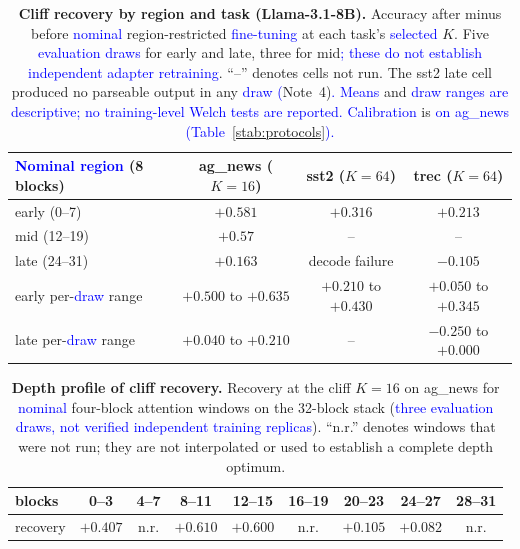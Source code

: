 \documentclass[11pt]{article}
\begin{document}
\begin{table}[h]
\centering
\caption{\textbf{Cliff recovery by region and task (Llama-3.1-8B).} Accuracy after minus
before \textcolor{blue}{nominal} region-restricted \textcolor{blue}{fine-tuning} at each task's \textcolor{blue}{selected} $K$. Five \textcolor{blue}{evaluation
draws} for early and late, three for mid\textcolor{blue}{; these do not establish independent adapter
retraining}. ``--'' denotes cells not run. The sst2 late cell produced no parseable output
in any \textcolor{blue}{draw (}Note~4)\textcolor{blue}{. Means} and \textcolor{blue}{draw ranges are descriptive; no training-level Welch
tests are reported. Calibration} is \textcolor{blue}{on ag\_}\textcolor{blue}{news (Table}~\textcolor{blue}{\ref{stab:protocols}}\textcolor{blue}{).}}
\label{stab:region}
\footnotesize
\begin{tabular}{lccc}
\toprule
\textcolor{blue}{Nominal region} (8 blocks) & ag\_news ($K{=}16$) & sst2 ($K{=}64$) & trec ($K{=}64$) \\
\midrule
early (0--7)  & $+0.581$ & $+0.316$ & $+0.213$ \\
mid (12--19)  & $+0.57$  & --       & --       \\
late (24--31) & $+0.163$ & decode failure & $-0.105$ \\
\midrule
early per-\textcolor{blue}{draw} range & $+0.500$ to $+0.635$ & $+0.210$ to $+0.430$ & $+0.050$ to $+0.345$ \\
late per-\textcolor{blue}{draw} range  & $+0.040$ to $+0.210$ & --                   & $-0.250$ to $+0.000$ \\
\bottomrule
\end{tabular}
\end{table}



\begin{table}[h]
\centering
\caption{\textbf{Depth profile of cliff recovery.} Recovery at the cliff $K{=}16$ on
ag\_news for \textcolor{blue}{nominal} four-block attention windows on the 32-block stack (\textcolor{blue}{three evaluation
draws, not verified independent training replicas}). ``n.r.'' denotes windows that were
not run; they are not interpolated or used to establish a complete depth optimum.}
\label{stab:depth}
\scriptsize
\setlength{\tabcolsep}{4pt}
\begin{tabular}{lcccccccc}
\toprule
blocks & 0--3 & 4--7 & 8--11 & 12--15 & 16--19 & 20--23 & 24--27 & 28--31 \\
\midrule
recovery & $+0.407$ & n.r. & $\mathbf{+0.610}$ & $\mathbf{+0.600}$ & n.r. & $+0.105$ & $+0.082$ & n.r. \\
\bottomrule
\end{tabular}
\end{table}
\end{document}
